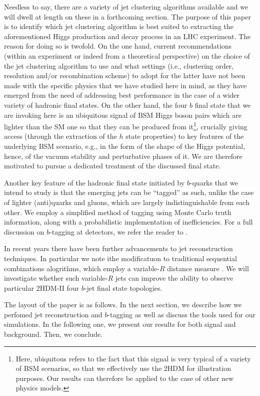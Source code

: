 \documentclass[12pt]{article}
\begin{document}
Needless to say, there are a variety of jet clustering algorithms available and we will dwell at length on these in a forthcoming section. The purpose of this paper is to identify which jet clustering algorithm is best suited to extracting the aforementioned Higgs production and decay process in an LHC experiment. The reason for doing so is twofold.
On the one hand, current recommendations (within an experiment or indeed from a theoretical perspective) on the choice of the jet clustering algorithm to use and what settings (i.e., clustering order, resolution and/or recombination scheme) to adopt for the latter have not been made with the specific physics that we have studied here in mind, as they have emerged from the need of addressing best performance in the case of a wider variety of hadronic final states. On the other hand, the four $b$ final state that we are invoking here is an ubiquitous signal of BSM Higgs boson pairs which are lighter than the SM one so that they can be produced from it\footnote{Here, ubiquitous refers to the fact that this signal is very typical of a variety of BSM scenarios, so that we effectively use the 2HDM for illustration purposes. Our results can therefore be applied to the case of other new physics models.}, crucially giving access (through the extraction of the $h$ state properties) to key features of the underlying BSM scenario, e.g., in the form of the shape of the Higgs potential, hence, of the vacuum stability and perturbative phases of it. We are therefore motivated to pursue a dedicated treatment of the discussed final state.

Another key feature of the hadronic final state initiated by $b$-quarks that we intend to study  is that the emerging jets can be ``tagged'' as such, unlike the case of lighter (anti)quarks and gluons, which are largely indistinguishable from each other. We employ a simplified method of tagging using Monte Carlo truth information, along with a probabilistic implementation of inefficiencies. For a full discussion on $b$-tagging at detectors, we refer the reader to \cite{Scodellaro:2017wli}.

In recent years there have been further advancements to jet reconstruction techniques. In particular we note ithe modificatuon to traditional sequential combinations alogrithms, which employ a variable-$R$ distance measure \cite{Krohn:2009zg}. We will investigate whether such variable-$R$ jets can improve the ability to observe particular 2HDM-II four $b$-jet final state topologies. 

{{The layout of the paper is as follows. In the next section, we describe how we perfomed jet reconstruction and $b$-tagging as well as discuss the tools  used for our simulations.}} In the following one, we   present our results for both signal and background. Then, we conclude.
\end{document}
